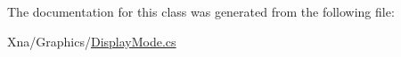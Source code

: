 The documentation for this class was generated from the following file\+:\begin{DoxyCompactItemize}
\item 
Xna/\+Graphics/\hyperlink{_display_mode_8cs}{Display\+Mode.\+cs}\end{DoxyCompactItemize}
